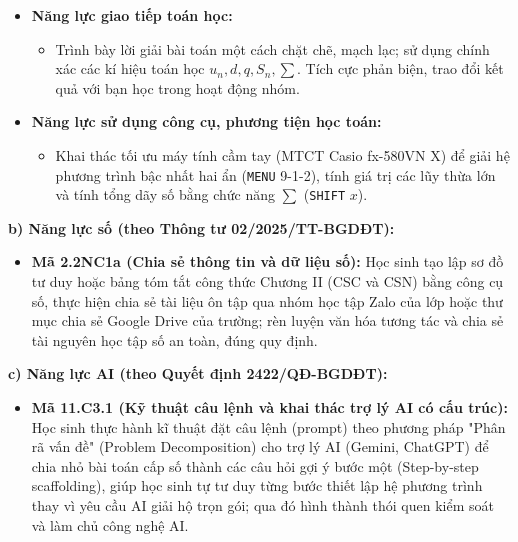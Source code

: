 \documentclass[12pt, a4paper]{article}
\begin{document}
\begin{itemize}[leftmargin=1.5em]
\begin{itemize}
        \item Mô hình hóa các tình huống thực tiễn thành bài toán cấp số: bài toán tiết kiệm tích lũy định kì, bài toán lãi kép ngân hàng, bài toán xếp chồng vật liệu dạng tháp, bài toán khấu hao tài sản hàng năm.
    \end{itemize}
    \item \textbf{Năng lực giao tiếp toán học:}
    \begin{itemize}
        \item Trình bày lời giải bài toán một cách chặt chẽ, mạch lạc; sử dụng chính xác các kí hiệu toán học $u_n, d, q, S_n, \sum$. Tích cực phản biện, trao đổi kết quả với bạn học trong hoạt động nhóm.
    \end{itemize}
    \item \textbf{Năng lực sử dụng công cụ, phương tiện học toán:}
    \begin{itemize}
        \item Khai thác tối ưu máy tính cầm tay (MTCT Casio fx-580VN X) để giải hệ phương trình bậc nhất hai ẩn (\texttt{MENU} 9-1-2), tính giá trị các lũy thừa lớn và tính tổng dãy số bằng chức năng $\sum$ (\texttt{SHIFT} $x$).
    \end{itemize}
\end{itemize}

\textbf{b) Năng lực số (theo Thông tư 02/2025/TT-BGDĐT):}
\begin{itemize}[leftmargin=1.5em]
    \item \textbf{Mã 2.2NC1a (Chia sẻ thông tin và dữ liệu số):} Học sinh tạo lập sơ đồ tư duy hoặc bảng tóm tắt công thức Chương II (CSC và CSN) bằng công cụ số, thực hiện chia sẻ tài liệu ôn tập qua nhóm học tập Zalo của lớp hoặc thư mục chia sẻ Google Drive của trường; rèn luyện văn hóa tương tác và chia sẻ tài nguyên học tập số an toàn, đúng quy định.
\end{itemize}

\textbf{c) Năng lực AI (theo Quyết định 2422/QĐ-BGDĐT):}
\begin{itemize}[leftmargin=1.5em]
    \item \textbf{Mã 11.C3.1 (Kỹ thuật câu lệnh và khai thác trợ lý AI có cấu trúc):} Học sinh thực hành kĩ thuật đặt câu lệnh (prompt) theo phương pháp "Phân rã vấn đề" (Problem Decomposition) cho trợ lý AI (Gemini, ChatGPT) để chia nhỏ bài toán cấp số thành các câu hỏi gợi ý bước một (Step-by-step scaffolding), giúp học sinh tự tư duy từng bước thiết lập hệ phương trình thay vì yêu cầu AI giải hộ trọn gói; qua đó hình thành thói quen kiểm soát và làm chủ công nghệ AI.
\end{itemize}
\end{document}
